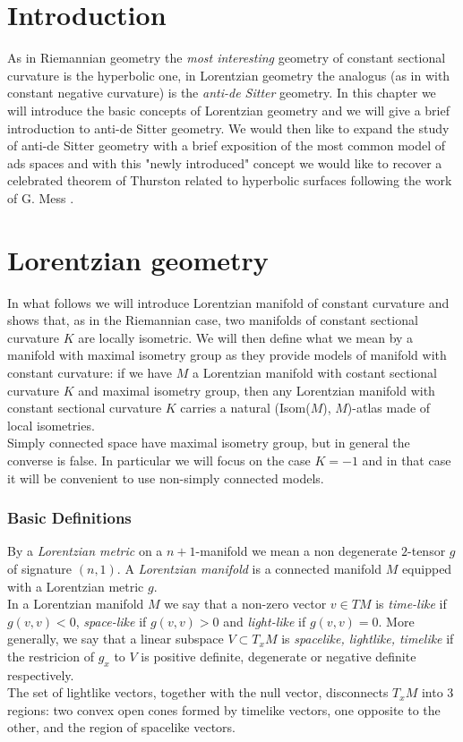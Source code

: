 \chapter{Introduction}

As in Riemannian geometry the \textit{most interesting} geometry of constant sectional curvature is the hyperbolic one, in Lorentzian geometry the analogus (as in with constant negative curvature) is the \textit{anti-de Sitter} geometry. In this chapter we will introduce the basic concepts of Lorentzian geometry and we will give a brief introduction to anti-de Sitter geometry. 
We would then like to expand the study of anti-de Sitter geometry with a brief exposition of the most common model of ads spaces and with this "newly introduced" concept we would like to recover a celebrated theorem of Thurston related to hyperbolic surfaces following the work of G. Mess \cite{mess2007lorentz}. 

\chapter{Lorentzian geometry}

In what follows we will introduce Lorentzian manifold of constant curvature and shows that, as in the Riemannian case, two manifolds of constant sectional curvature $K$ are locally isometric. We will then define what we mean by a manifold with maximal isometry group as they provide models of manifold with constant curvature: if we have $M$ a Lorentzian manifold with costant sectional curvature $K$ and maximal isometry group, then any Lorentzian manifold with constant sectional curvature $K$ carries a natural (Isom($M$), $M$)-atlas made of local isometries. \\
Simply connected space have maximal isometry group, but in general the converse is false. In particular we will focus on the case $K=-1$ and in that case it will be convenient to use non-simply connected models. 

\subsection{Basic Definitions}
By a \textit{Lorentzian metric} on a $n+1$-manifold we mean a non degenerate $2$-tensor $g$ of signature $(n,1)$. A \textit{Lorentzian manifold} is a connected manifold $M$ equipped with a Lorentzian metric $g$.\\
In a Lorentzian manifold $M$ we say that a non-zero vector $v \in TM$ is \textit{time-like} if $g(v,v)<0$, \textit{space-like} if $g(v,v)>0$ and \textit{light-like} if $g(v,v)=0$. More generally, we say that a linear subspace $V \subset T_{x}M$ is \textit{spacelike, lightlike, timelike} if the restricion of $g_x$ to $V$ is positive definite, degenerate or negative definite respectively.\\
The set of lightlike vectors, together with the null vector, disconnects $T_{x}M$ into 3 regions: two convex open cones formed by timelike vectors, one opposite to the other, and the region of spacelike vectors. 


